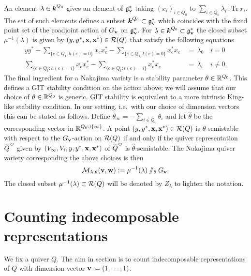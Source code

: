 \documentclass{amsart}
\theoremstyle{definition}
\begin{document}
An element $\lambda \in {\boldsymbol{k}}^{Q_0}$ gives an element of $\mathfrak{g}_{\mathbf{v}}^*$ taking $(x_i)_{i\in Q_0}$ to $\sum_{i\in Q_0} \lambda_i \cdot \text{Tr}\, x_i$.
The set of such elements defines a subset ${\boldsymbol{k}}^{Q_0} \subset \mathfrak{g}_{\mathbf{v}}^*$ which coincides with the fixed point set of the coadjoint action of $G_{\mathbf{v}}$ on $\mathfrak{g}_{\mathbf{v}}^*$.
For $\lambda \in {\boldsymbol{k}}^{Q_0} \subset \mathfrak{g}_{\mathbf{v}}^*$ the closed subset $\mu^{-1}(\lambda)$ is given by $(y,y^*,\mathbf{x},\mathbf{x}^*) \in \mathcal{R}(Q)$ that satisfy the following equations 
\begin{align}\label{eq:forz}
y y^* + \sum_{\{e \in Q_1\colon h(e)=0\}} x_e x_e^* -  \sum_{\{e \in Q_1\colon t(e)=0\}} x_e^* x_e \,&=\, \lambda_0 \, & i=0 \\
\label{eq:forz2}\sum_{\{e \in Q_1\colon h(e)=i\}} x_e x_e^* -  \sum_{\{e \in Q_1\colon t(e)=i\}} x_e^* x_e\,&=\,\lambda_i \, & i\ne0.
\end{align}
The final ingredient for a Nakajima variety is a stability parameter $\theta \in \mathbb{R}^{Q_0}$.
This defines a GIT stability condition on the action above; we will assume that our choice of $\theta \in \mathbb{R}^{Q_0}$ is generic.
GIT stability is equivalent to a more intrinsic King-like stability condition.
In our setting, i.e.\ with our choice of dimension vectors this can be stated as follows.
Define $\theta_\infty =- \sum_{i\in Q_0}\theta_i$ and let $\hat{\theta}$ be the corresponding vector in $\mathbb{R}^{Q_0 \cup \{\infty\}}$.
A point $(y,y^*,\mathbf{x},\mathbf{x}^*) \in \mathcal{R}(Q)$ is $\theta$-semistable with respect to the $G_{\mathbf{v}}$-action on $\mathcal{R}(Q)$ if and only if the quiver representation ${\overline{Q}}^\heartsuit$ given by $(V_\infty, V_i, y, y^*, \mathbf{x},\mathbf{x}^*)$ of ${\overline{Q}}^\heartsuit$ is $\hat{\theta}$-semistable.
The Nakajima quiver variety corresponding the above choices is then $$\mathcal{M}_{\lambda, \theta}(\mathbf{v}, \mathbf{w}) := \mu^{-1}(\lambda)\sslash_\theta G_{\mathbf{v}}.$$
The closed subset $\mu^{-1}(\lambda) \subset \mathcal{R}(Q)$ will be denoted by $Z_\lambda$ to lighten the notation. 

\section{Counting indecomposable representations}\label{sc:indecomp}
We fix a quiver $Q$.
The aim in section is to count indecomposable representations of $Q$ with dimension vector $\mathbf{v}:= (1,\ldots,1)$.
\end{document}
